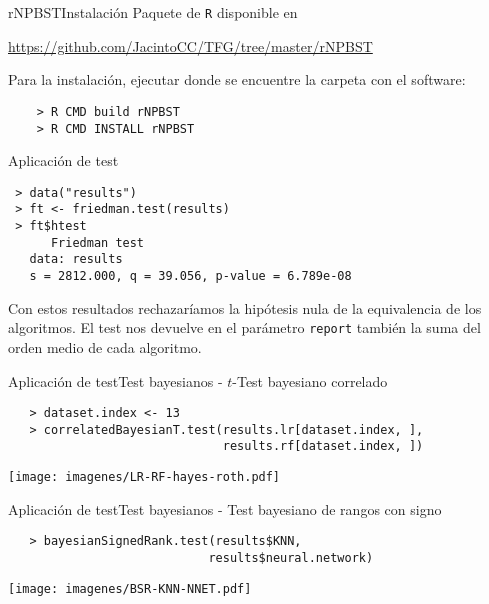 \documentclass[leqno]{beamer}
\theoremstyle{definition_wo_parentheses}
\begin{document}
\begin{frame}[fragile]{rNPBST}{Instalación}
Paquete de \texttt{R} disponible en 
\begin{center}
\url{https://github.com/JacintoCC/TFG/tree/master/rNPBST}
\end{center}
Para la instalación, ejecutar donde se encuentre la carpeta con el software:
	\begin{verbatim}
	> R CMD build rNPBST
	> R CMD INSTALL rNPBST
	\end{verbatim}
\end{frame}


\begin{frame}[fragile]{Aplicación de test}
\begin{verbatim}
 > data("results")
 > ft <- friedman.test(results)
 > ft$htest
      Friedman test
   data: results
   s = 2812.000, q = 39.056, p-value = 6.789e-08
\end{verbatim}
Con estos resultados rechazaríamos la hipótesis nula de la 
equivalencia de los algoritmos. El test nos devuelve en el 
parámetro \texttt{report} también la suma del orden
medio de cada algoritmo. 
\end{frame}


\begin{frame}[fragile]{Aplicación de test}{Test bayesianos - $t$-Test bayesiano correlado}
   \begin{verbatim}
   > dataset.index <- 13
   > correlatedBayesianT.test(results.lr[dataset.index, ],
                              results.rf[dataset.index, ])
   \end{verbatim}
   \begin{center}
   \texttt{[image: imagenes/LR-RF-hayes-roth.pdf]}
   \end{center}
\end{frame}


\begin{frame}[fragile]{Aplicación de test}{Test bayesianos - Test bayesiano de rangos con signo}
   \begin{verbatim}
   > bayesianSignedRank.test(results$KNN,
                            results$neural.network)
   \end{verbatim}
   \begin{center}
   \texttt{[image: imagenes/BSR-KNN-NNET.pdf]}
   \end{center}
\end{frame}
\end{document}
